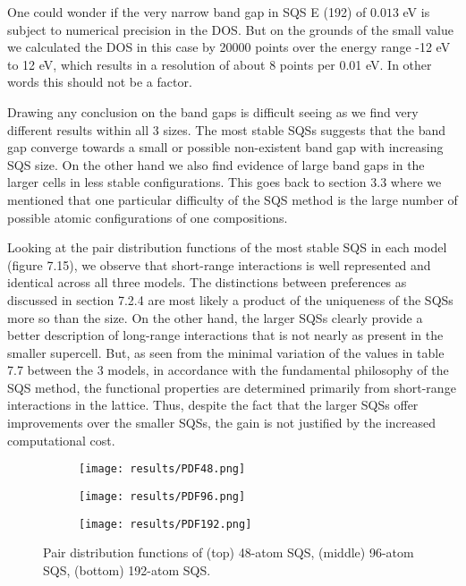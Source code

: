 One could wonder if the very narrow band gap in SQS E (192) of $0.013$ eV is subject to numerical precision in the DOS. But on the grounds of the small value we calculated the DOS in this case by 20000 points over the energy range -12 eV to 12 eV, which results in a resolution of about 8 points per 0.01 eV. In other words this should not be a factor. 
 
Drawing any conclusion on the band gaps is difficult seeing as we find very different results within all 3 sizes. The most stable SQSs suggests that the band gap converge towards a small or possible non-existent band gap with increasing SQS size. On the other hand we also find evidence of large band gaps in the larger cells in less stable configurations. This goes back to section 3.3 where we mentioned that one particular difficulty of the SQS method is the large number of possible atomic configurations of one compositions.    

Looking at the pair distribution functions of the most stable SQS in each model (figure 7.15), we observe that short-range interactions is well represented and identical across all three models. The distinctions between preferences as discussed in section 7.2.4 are most likely a product of the uniqueness of the SQSs more so than the size. On the other hand, the larger SQSs clearly provide a better description of long-range interactions that is not nearly as present in the smaller supercell. But, as seen from the minimal variation of the values in table 7.7 between the 3 models, in accordance with the fundamental philosophy of the SQS method, the functional properties are determined primarily from short-range interactions in the lattice. Thus, despite the fact that the larger SQSs offer improvements over the smaller SQSs, the gain is not justified by the increased computational cost.

\begin{figure}[H]
\begin{subfigure}{\textwidth}
\texttt{[image: results/PDF48.png]}
\end{subfigure}
\begin{subfigure}{\textwidth}
\texttt{[image: results/PDF96.png]}
\end{subfigure}
\begin{subfigure}{\textwidth}
\texttt{[image: results/PDF192.png]}
\end{subfigure}
\caption{Pair distribution functions of  (top) 48-atom SQS, (middle) 96-atom SQS, (bottom) 192-atom SQS.}
\end{figure}
